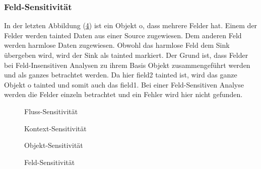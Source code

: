 \documentclass[runningheads]{llncs}
\begin{document}
\subsubsection{Feld-Sensitivität}
In der letzten Abbildung (\ref{fig:field_code}) ist ein Objekt o, dass mehrere Felder hat. Einem der Felder werden tainted Daten aus einer Source zugewiesen. Dem anderen Feld werden harmlose Daten zugewiesen. Obwohl das harmlose Feld dem Sink übergeben wird, wird der Sink als tainted markiert. Der Grund ist, dass Felder bei Feld-Insensitiven Analysen zu ihrem Basis Objekt zusammengeführt werden und als ganzes betrachtet werden. Da hier field2 tainted ist, wird das ganze Objekt o tainted und somit auch das field1. Bei einer Feld-Sensitiven Analyse werden die Felder einzeln betrachtet und ein Fehler wird hier nicht gefunden.
 \begin{figure}

\caption{Fluss-Sensitivität}
\label{fig:fluss_code}
\end{figure}
\begin{figure}

\caption{Kontext-Sensitivität}
\label{fig:context_code}
\end{figure}
\begin{figure}

\caption{Objekt-Sensitivität}
\label{fig:object_code} 
\end{figure}
\begin{figure}

\caption{Feld-Sensitivität}
\label{fig:field_code}
\end{figure}
\\\\
\end{document}
